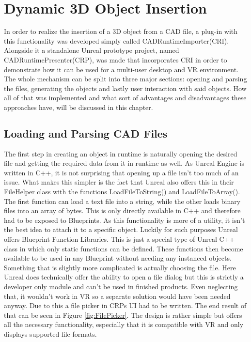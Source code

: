 \chapter{Dynamic 3D Object Insertion}\label{chp:ObjectLoading}

In order to realize the insertion of a 3D object from a CAD file, a plug-in with this functionality was developed simply called CADRuntimeImporter(CRI). Alongside it a standalone Unreal prototype project, named CADRuntimePresenter(CRP), was made that incorporates CRI in order to demonstrate how it can be used for a multi-user desktop and VR environment. The whole mechanism can be split into three major sections: opening and parsing the files, generating the objects and lastly user interaction with said objects. How all of that was implemented and what sort of advantages and disadvantages these approaches have, will be discussed in this chapter.
\section{Loading and Parsing CAD Files}

The first step in creating an object in runtime is naturally opening the desired file and getting the required data from it in runtime as well. As Unreal Engine is written in C++, it is not surprising that opening up a file isn't too much of an issue. What makes this simpler is the fact that Unreal also offers this in their FileHelper class with the functions LoadFileToString() and LoadFileToArray(). The first function can load a text file into a string, while the other loads binary files into an array of bytes. This is only directly available in C++ and therefore had to be exposed to Blueprints. As this functionality is more of a utility, it isn't the best idea to attach it to a specific object. Luckily for such purposes Unreal offers Blueprint Function Libraries. This is just a special type of Unreal C++ class in which only static functions can be defined. These functions then become available to be used in any Blueprint without needing any instanced objects.\\

Something that is slightly more complicated is actually choosing the file. Here Unreal does technically offer the ability to open a file dialog but this is strictly a developer only module and can't be used in finished products. Even neglecting that, it wouldn't work in VR so a separate solution would have been needed anyway. Due to this a file picker in CRPs UI had to be written. The end result of that can be seen in Figure \ref{fig:FilePicker}. The design is rather simple but offers all the necessary functionality, especially that it is compatible with VR and only displays supported file formats.\\

